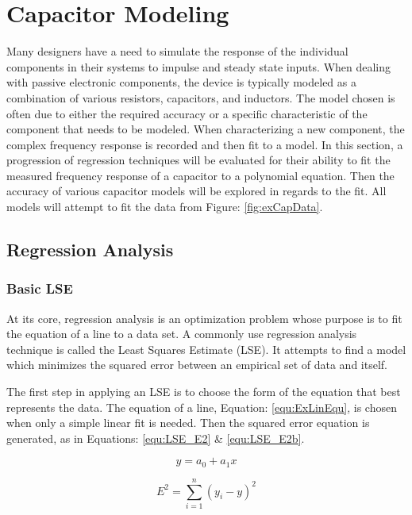 \section {Capacitor Modeling}
\label{sec:CapacitorModeling}

Many designers have a need to simulate the response of the individual components in their systems to impulse and steady state inputs. When dealing with passive electronic components, the device is typically modeled as a combination of various resistors, capacitors, and inductors. The model chosen is often due to either the required accuracy or a specific characteristic of the component that needs to be modeled. When characterizing a new component, the complex frequency response is recorded and then fit to a model. In this section, a progression of regression techniques will be evaluated for their ability to fit the measured frequency response of a capacitor to a polynomial equation. Then the accuracy of various capacitor models will be explored in regards to the fit. All models will attempt to fit the data from Figure: \ref{fig:exCapData}.




\subsection{Regression Analysis}
\label{sec:RegressionAnalysis}
\subsubsection{Basic LSE}
At its core, regression analysis is an optimization problem whose purpose is to fit the equation of a line to a data set. A commonly use regression analysis technique is called the Least Squares Estimate (LSE). It attempts to find a model which minimizes the squared error between an empirical set of data and itself.

The first step in applying an LSE is to choose the form of the equation that best represents the data. The equation of a line, Equation: \eqref{equ:ExLinEqu}, is chosen when only a simple linear fit is needed.
Then the squared error equation is generated, as in Equations: \eqref{equ:LSE_E2} \& \eqref{equ:LSE_E2b}.

\begin{equation}
    \label{equ:ExLinEqu}
    y = a_0 + a_1 x
\end{equation}

\begin{equation}
    \label{equ:LSE_E2}
    E^2 = \sum_{i=1}^{n} (y_i - y)^2
\end{equation}

